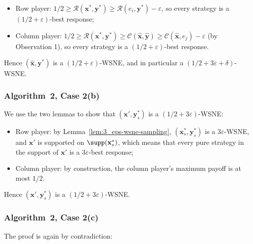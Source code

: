 \begin{itemize}
  \item Row player: \(1/2 \ge \mathcal{R}(\mathbf{x}^*, \mathbf{y}^*) \ge \mathcal{R}(e_i, \mathbf{y}^*) - \varepsilon\), so every strategy is a \((1/2 + \varepsilon)\)-best response;
  \item Column player: \(1/2 \ge \mathcal{R}(\mathbf{x}^*, \mathbf{y}^*) \ge \mathcal{C}(\hat{\mathbf{x}}, \hat{\mathbf{y}}) \ge \mathcal{C}(\hat{\mathbf{x}}, e_j) - \varepsilon\) (by Observation 1), so every strategy is a \((1/2 + \varepsilon)\)-best response.
\end{itemize}

Hence \((\hat{\mathbf{x}}, \mathbf{y}^*)\) is a \((1/2 + \varepsilon)\)-WSNE, and in particular a \((1/2 + 3\varepsilon + \delta)\)-WSNE.

\subsubsection{Algorithm~2, Case 2(b)}
\label{app:case-two-low-high}

We use the two lemmas to show that \((\mathbf{x}', \mathbf{y}_s^*)\) is a \((1/2 + 3\varepsilon)\)-WSNE:

\begin{itemize}
  \item Row player: by Lemma~\ref{lem:3_eps-wsne-sampling}, \((\mathbf{x}_s^*, \mathbf{y}_s^*)\) is a \(3\varepsilon\)-WSNE, and \(\mathbf{x}'\) is supported on \(\supp(\mathbf{x}_s^*)\), which means that every pure strategy in the support of \(\mathbf{x}'\) is a \(3\varepsilon\)-best response;
  \item Column player: by construction, the column player's maximum payoff is at most \(1/2\).
\end{itemize}

Hence \((\mathbf{x}', \mathbf{y}_s^*)\) is a \((1/2 + 3\varepsilon)\)-WSNE.

\subsubsection{Algorithm~2, Case 2(c)}
\label{app:case-two-both-high}

The proof is again by contradiction:

